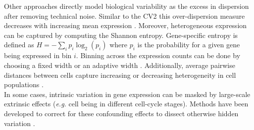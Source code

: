 Other approaches directly model biological variability as the excess in dispersion after removing technical noise. Similar to the CV2 this over-dispersion measure decreases with increasing mean expression \citep{Vallejos2015BASiCS}. Moreover, heterogeneous expression can be captured by computing the Shannon entropy. Gene-specific entropy is defined as $H=-\sum_i{}p_i\log_2(p_i)$ where $p_i$ is the probability for a given gene being expressed in bin $i$. Binning across the expression counts can be done by choosing a fixed width \citep{Richard2016} or an adaptive width \citep{Stumpf2017}. Additionally, average pairwise distances between cells capture increasing or decreasing heterogeneity in cell populations \citep{Mohammed2017}. \\ 

In some cases, intrinsic variation in gene expression can be masked by large-scale extrinsic effects (\emph{e.g.} cell being in different cell-cycle stages). Methods have been developed to correct for these confounding effects to dissect otherwise hidden variation \citep{Buettner2015, Buettner2017}.
